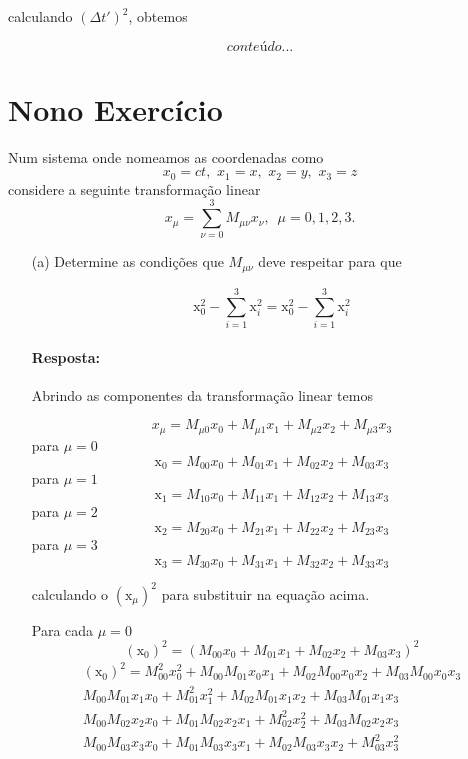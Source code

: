 \documentclass[10pt,a4paper]{article}
\begin{document}
calculando $ (\Delta t')^2 $, obtemos

\begin{equation*}
	conteúdo...
\end{equation*}

	
	\section{Nono Exercício}
	Num sistema onde nomeamos as coordenadas como
	$$x_0 = ct,\,\,x_1 =x,\,\,x_2=y,\,\,x_3=z$$
	considere a seguinte transformação linear
	$$x_\mu = \sum_{\nu=0}^{3} M_{\mu\nu} x_\nu,\,\,\,\mu =0,1,2,3.$$
	\begin{enumerate}
		\item[(a)] Determine as condições que $ M_{\mu\nu} $ deve respeitar para que
		
		$$ \text{\~{x}}^2_0 - \sum_{i=1}^{3} \text{\~{x}}^2_i = \text{x}^2_0 - \sum_{i=1}^{3} \text{x}^2_i $$
	
	\paragraph{Resposta:}
	Abrindo as componentes da transformação linear temos
	
	$$ x_\mu = M_{\mu0} x_0 + M_{\mu1} x_1+M_{\mu2} x_2+M_{\mu3} x_3 $$
	para $ \mu =0 $
	$$ \text{\~{x}}_0 = M_{00} x_0 + M_{01} x_1+M_{02} x_2+M_{03} x_3 $$
	para $ \mu =1 $
	$$ \text{\~{x}}_1 = M_{10} x_0 + M_{11} x_1+M_{12} x_2+M_{13} x_3 $$
	para $ \mu =2 $
	$$\text{\~{x}}_2 = M_{20} x_0 + M_{21} x_1+M_{22} x_2+M_{23} x_3 $$
	para $ \mu =3 $
	$$ \text{\~{x}}_3 = M_{30} x_0 + M_{31} x_1+M_{32} x_2+M_{33} x_3 $$
	 
	 calculando o $( \text{\~{x}}_\mu)^2 $ para substituir na equação acima.
	 
	 Para cada $ \mu=0 $
	 $$ (\text{\~{x}}_0)^2 =  (M_{00} x_0 + M_{01} x_1+M_{02} x_2+M_{03} x_3)^2 $$
	 \begin{equation}\nonumber
	 	\begin{split}
	 		(\text{\~{x}}_0)^2 =  M_{00}^2 x_0^2 + M_{00}M_{01} x_0x_1+M_{02}M_{00} x_0 x_2+M_{03}M_{00} x_0 x_3\\ 
	 		M_{00}M_{01} x_1 x_0 + M_{01}^2 x_1^2+M_{02}M_{01} x_1 x_2+M_{03}M_{01} x_1 x_3\\
	 		M_{00}M_{02} x_2 x_0 + M_{01}M_{02} x_2 x_1+M_{02}^2x_2^2+M_{03} M_{02} x_2x_3\\
	 		M_{00}M_{03} x_3 x_0 + M_{01}M_{03} x_3 x_1+M_{02}M_{03} x_3 x_2+M_{03}^2 x_3^2
	 	\end{split}
	 \end{equation}
 

\end{enumerate}
\end{document}
